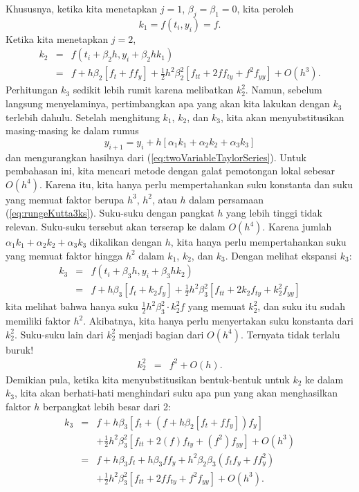 Khususnya, ketika kita menetapkan $j=1$, $\beta_{j}=\beta_{1}=0$,
kita peroleh
\[
k_{1}=f(t_{i},y_{i})=f.
\]
Ketika kita menetapkan $j=2$, 
\begin{eqnarray*}
k_{2} & = & f\left(t_{i}+\beta_{2}h,y_{i}+\beta_{2}hk_{1}\right)\\
 & = & f+h\beta_{2}\left[f_{t}+ff_{y}\right]+\frac{1}{2}h^{2}\beta_{2}^{2}\left[f_{tt}+2ff_{ty}+f^{2}f_{yy}\right]+O(h^{3}).
\end{eqnarray*}
Perhitungan $k_{3}$ sedikit lebih rumit karena melibatkan $k_{2}^{2}$.
Namun, sebelum langsung menyelaminya, pertimbangkan apa yang akan
kita lakukan dengan $k_{3}$ terlebih dahulu. Setelah menghitung $k_{1}$,
$k_{2}$, dan $k_{3}$, kita akan menyubstitusikan masing-masing ke
dalam rumus
\begin{equation}
y_{i+1}=y_{i}+h\left[\alpha_{1}k_{1}+\alpha_{2}k_{2}+\alpha_{3}k_{3}\right]\label{eq:rungeKutta3ks}
\end{equation}
dan mengurangkan hasilnya dari (\ref{eq:twoVariableTaylorSeries}).
Untuk pembahasan ini, kita mencari metode dengan galat pemotongan
lokal sebesar $O(h^{4})$. Karena itu, kita hanya perlu mempertahankan
suku konstanta dan suku yang memuat faktor berupa $h^{3}$, $h^{2}$,
atau $h$ dalam persamaan (\ref{eq:rungeKutta3ks}). Suku-suku dengan
pangkat $h$ yang lebih tinggi tidak relevan. Suku-suku tersebut akan
terserap ke dalam $O(h^{4})$. Karena jumlah $\alpha_{1}k_{1}+\alpha_{2}k_{2}+\alpha_{3}k_{3}$
dikalikan dengan $h$, kita hanya perlu mempertahankan suku yang memuat
faktor hingga $h^{2}$ dalam $k_{1}$, $k_{2}$, dan $k_{3}$. Dengan
melihat ekspansi $k_{3}$:
\begin{eqnarray*}
k_{3} & = & f\left(t_{i}+\beta_{3}h,y_{i}+\beta_{3}hk_{2}\right)\\
 & = & f+h\beta_{3}\left[f_{t}+k_{2}f_{y}\right]+\frac{1}{2}h^{2}\beta_{3}^{2}\left[f_{tt}+2k_{2}f_{ty}+k_{2}^{2}f_{yy}\right]
\end{eqnarray*}
kita melihat bahwa hanya suku $\frac{1}{2}h^{2}\beta_{3}^{2}\cdot k_{2}^{2}f$
yang memuat $k_{2}^{2}$, dan suku itu sudah memiliki faktor $h^{2}$.
Akibatnya, kita hanya perlu menyertakan suku konstanta dari $k_{2}^{2}$.
Suku-suku lain dari $k_{2}^{2}$ menjadi bagian dari $O(h^{4})$.
Ternyata tidak terlalu buruk!
\begin{eqnarray*}
k_{2}^{2} & = & f^{2}+O(h).
\end{eqnarray*}
Demikian pula, ketika kita menyubstitusikan bentuk-bentuk untuk $k_{2}$
ke dalam $k_{3}$, kita akan berhati-hati menghindari suku apa pun
yang akan menghasilkan faktor $h$ berpangkat lebih besar dari 2:
\begin{eqnarray*}
k_{3} & = & f+h\beta_{3}\left[f_{t}+\left(f+h\beta_{2}\left[f_{t}+ff_{y}\right]\right)f_{y}\right]\\
 &  & +\frac{1}{2}h^{2}\beta_{3}^{2}\left[f_{tt}+2(f)f_{ty}+\left(f^{2}\right)f_{yy}\right]+O(h^{3})\\
 & = & f+h\beta_{3}f_{t}+h\beta_{3}ff_{y}+h^{2}\beta_{2}\beta_{3}(f_{t}f_{y}+ff_{y}^{2})\\
 &  & +\frac{1}{2}h^{2}\beta_{3}^{2}\left[f_{tt}+2ff_{ty}+f^{2}f_{yy}\right]+O(h^{3}).
\end{eqnarray*}

